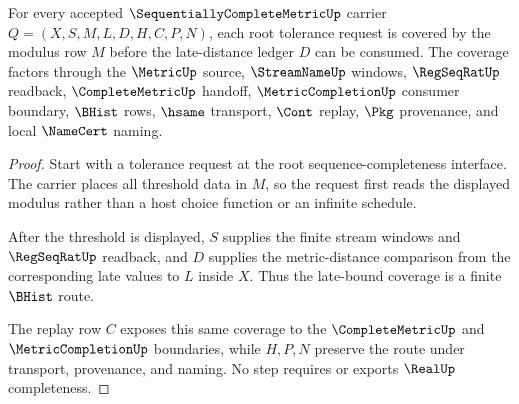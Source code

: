 \begin{theorem}
\label{thm:sequentially-complete-metric-root-modulus-coverage}
For every accepted $\SequentiallyCompleteMetricUp$ carrier $Q=(X,S,M,L,D,H,C,P,N)$, each root tolerance request is covered by the modulus row $M$ before the late-distance ledger $D$ can be consumed. The coverage factors through the $\MetricUp$ source, $\StreamNameUp$ windows, $\RegSeqRatUp$ readback, $\CompleteMetricUp$ handoff, $\MetricCompletionUp$ consumer boundary, $\BHist$ rows, $\hsame$ transport, $\Cont$ replay, $\Pkg$ provenance, and local $\NameCert$ naming.
\end{theorem}
\begin{proof}
Start with a tolerance request at the root sequence-completeness interface. The carrier places all threshold data in $M$, so the request first reads the displayed modulus rather than a host choice function or an infinite schedule.

After the threshold is displayed, $S$ supplies the finite stream windows and $\RegSeqRatUp$ readback, and $D$ supplies the metric-distance comparison from the corresponding late values to $L$ inside $X$. Thus the late-bound coverage is a finite $\BHist$ route.

The replay row $C$ exposes this same coverage to the $\CompleteMetricUp$ and $\MetricCompletionUp$ boundaries, while $H,P,N$ preserve the route under transport, provenance, and naming. No step requires or exports $\RealUp$ completeness.
\end{proof}

